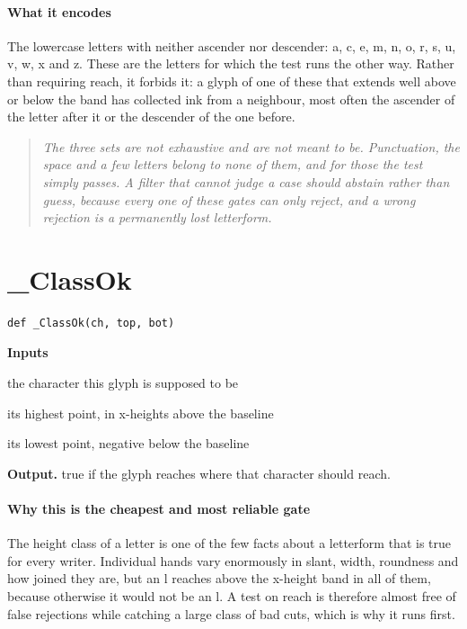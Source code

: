 \paragraph{What it encodes}
The lowercase letters with neither ascender nor descender: a, c, e, m, n, o, r, s, u, v, w, x and z. These are the letters for which the test runs the other way. Rather than requiring reach, it forbids it: a glyph of one of these that extends well above or below the band has collected ink from a neighbour, most often the ascender of the letter after it or the descender of the one before.


\begin{quote}\small\itshape The three sets are not exhaustive and are not meant to be. Punctuation, the space and a few letters belong to none of them, and for those the test simply passes. A filter that cannot judge a case should abstain rather than guess, because every one of these gates can only reject, and a wrong rejection is a permanently lost letterform.\end{quote}

\section{\_ClassOk}
\begin{lstlisting}[style=sig]
def _ClassOk(ch, top, bot)
\end{lstlisting}

\noindent\textbf{Inputs}
\begin{description}[leftmargin=2.2em,style=nextline,font=\normalfont\ttfamily]\setlength\itemsep{1pt}
  \item[{ch}] \normalfont the character this glyph is supposed to be
  \item[{top}] \normalfont its highest point, in x-heights above the baseline
  \item[{bot}] \normalfont its lowest point, negative below the baseline
\end{description}

\noindent\textbf{Output.} true if the glyph reaches where that character should reach.


\paragraph{Why this is the cheapest and most reliable gate}
The height class of a letter is one of the few facts about a letterform that is true for every writer. Individual hands vary enormously in slant, width, roundness and how joined they are, but an l reaches above the x-height band in all of them, because otherwise it would not be an l. A test on reach is therefore almost free of false rejections while catching a large class of bad cuts, which is why it runs first.


